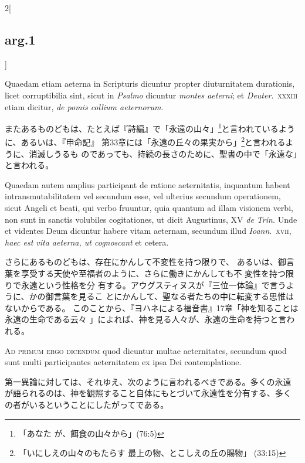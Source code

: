 \documentclass[paper=a4paper,fontsize=10pt,jafontsize=9pt,titlepage]{jlreq}
\begin{document}
\begin{paracol}{2}[\subsection{arg.1}]
\switchcolumn*

Quaedam etiam aeterna in Scripturis dicuntur propter diuturnitatem
durationis, licet corruptibilia sint, sicut in {\itshape Psalmo} dicuntur
{\itshape montes aeterni}; et {\itshape Deuter}.~{\scshape xxxiii} etiam dicitur, {\itshape de
pomis collium aeternorum}.

\switchcolumn

またあるものどもは、たとえば『詩編』で「永遠の山々」\footnote{「あなた
が、餌食の山々から」(76:5)}と言われているように、あるいは、『申命記』
第33章には「永遠の丘々の果実から」\footnote{「いにしえの山々のもたらす
最上の物、とこしえの丘の賜物」 (33:15)}と言われるように、消滅しうるも
のであっても、持続の長さのために、聖書の中で「永遠な」と言われる。

\switchcolumn*

Quaedam autem amplius participant de ratione aeternitatis, inquantum
habent intransmutabilitatem vel secundum esse, vel ulterius secundum
operationem, sicut Angeli et beati, qui verbo fruuntur, quia quantum ad
illam visionem verbi, non sunt in sanctis volubiles cogitationes, ut
dicit Augustinus, XV {\itshape de Trin.} Unde et videntes Deum dicuntur
habere vitam aeternam, secundum illud {\itshape Ioann}.~{\scshape xvii}, {\itshape haec
est vita aeterna, ut cognoscant} et cetera.

\switchcolumn

さらにあるものどもは、存在にかんして不変性を持つ限りで、
あるいは、御言葉を享受する天使や至福者のように、さらに働きにかんしても不
変性を持つ限りで永遠という性格を分
有する。アウグスティヌスが『三位一体論』で言うように、かの御言葉を見るこ
とにかんして、聖なる者たちの中に転変する思惟はないからである。
このことから、『ヨハネによる福音書』17章「神を知ることは永遠の生命である云々
」によれば、神を見る人々が、永遠の生命を持つと言われる。

\switchcolumn*[\subsection{ad.1}]

{\scshape Ad primum ergo dicendum} quod dicuntur multae aeternitates,
secundum quod sunt multi participantes aeternitatem ex ipsa Dei
contemplatione.

\switchcolumn

第一異論に対しては、それゆえ、次のように言われるべきである。多くの永遠
が語られるのは、神を観照すること自体にもとづいて永遠性を分有する、多く
の者がいるということにしたがってである。


\end{paracol}
\end{document}

